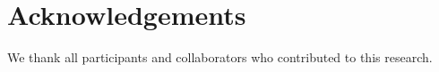 
\section*{Acknowledgements}
We thank all participants and collaborators who contributed to this research.
